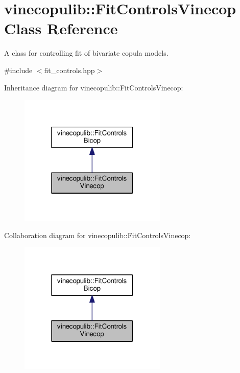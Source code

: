 \hypertarget{classvinecopulib_1_1_fit_controls_vinecop}{}\section{vinecopulib\+:\+:Fit\+Controls\+Vinecop Class Reference}
\label{classvinecopulib_1_1_fit_controls_vinecop}


A class for controlling fit of bivariate copula models.  




{\ttfamily \#include $<$fit\+\_\+controls.\+hpp$>$}



Inheritance diagram for vinecopulib\+:\+:Fit\+Controls\+Vinecop\+:
\nopagebreak
\begin{figure}[H]
\begin{center}
\leavevmode
\includegraphics[width=199pt]{classvinecopulib_1_1_fit_controls_vinecop__inherit__graph}
\end{center}
\end{figure}


Collaboration diagram for vinecopulib\+:\+:Fit\+Controls\+Vinecop\+:
\nopagebreak
\begin{figure}[H]
\begin{center}
\leavevmode
\includegraphics[width=199pt]{classvinecopulib_1_1_fit_controls_vinecop__coll__graph}
\end{center}
\end{figure}
